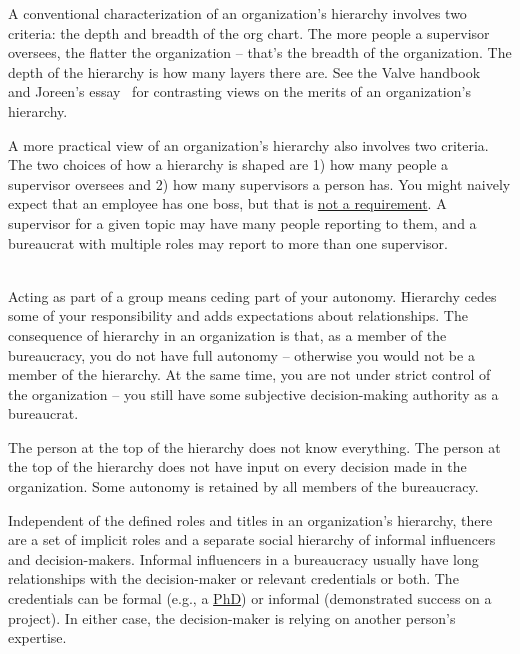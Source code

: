 A conventional characterization of an organization's hierarchy involves two criteria: the depth and breadth of the \gls{org chart}.
The more people a supervisor oversees, the flatter the organization -- that's the breadth of the organization. The depth of the hierarchy is how many layers there are. See the Valve handbook~\cite{2012_Valve} and Joreen's essay~\cite{1972_Joreen} for contrasting views on the merits of an organization's hierarchy. 

A more practical view of an organization's hierarchy also involves two criteria. The two choices of how a hierarchy is shaped are 
1) how many people a supervisor oversees and 
2) how many supervisors a person has. 
You might naively expect that an employee has one boss, but that is \href{https://en.wikipedia.org/wiki/Matrix_management}{not a requirement}. 
A supervisor for a given topic may have many people reporting to them, and a bureaucrat with multiple roles may report to more than one supervisor.

\ \\

Acting as part of a group means ceding part of your autonomy. Hierarchy cedes some of your responsibility and adds expectations about relationships.
The consequence of hierarchy in an organization is that, as a member of the bureaucracy, you do not have full autonomy -- otherwise you would not be a member of the hierarchy. At the same time, you are not under strict control of the organization -- you still have some subjective decision-making authority as a bureaucrat.

The person at the top of the hierarchy does not know everything. The person at the top of the hierarchy does not have input on every decision made in the organization. Some autonomy is retained by all members of the bureaucracy.

Independent of the defined roles and titles in an organization's hierarchy, there are a set of implicit roles and a separate social hierarchy of informal influencers and decision-makers. Informal influencers in a bureaucracy usually have long relationships with the decision-maker or relevant credentials or both. The credentials can be formal (e.g., a \href{https://en.wikipedia.org/wiki/Doctor_of_Philosophy}{PhD}) 
or informal (demonstrated success on a project). In either case, the decision-maker is relying on another person's expertise. 

